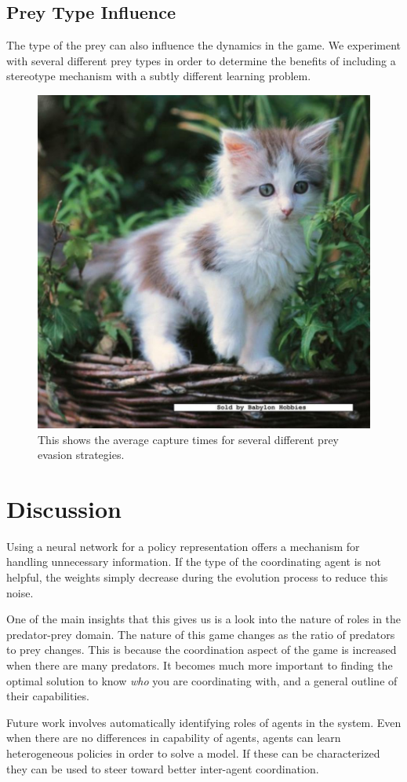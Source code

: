 \documentclass{aamas2014}
\begin{document}
\subsection{Prey Type Influence}

The type of the prey can also influence the dynamics in the game. We experiment with several different prey types in order to determine the benefits of including a stereotype mechanism with a subtly different learning problem.

\begin{figure}[h!]
\includegraphics[width=.5\textwidth]{pics/kitten}
\caption{This shows the average capture times for several different prey evasion strategies.}
\label{fig:evasion}
\end{figure}


\section{Discussion}
\label{sec:discussion}

Using a neural network for a policy representation offers a mechanism for handling unnecessary information. If the type of the coordinating agent is not helpful, the weights simply decrease during the evolution process to reduce this noise.

One of the main insights that this gives us is a look into the nature of roles in the predator-prey domain. The nature of this game changes as the ratio of predators to prey changes. This is because the coordination aspect of the game is increased when there are many predators. It becomes much more important to finding the optimal solution to know \emph{who} you are coordinating with, and a general outline of their capabilities.

Future work involves automatically identifying roles of agents in the system. Even when there are no differences in capability of agents, agents can learn heterogeneous policies in order to solve a model. If these can be characterized they can be used to steer toward better inter-agent coordination.
\end{document}
